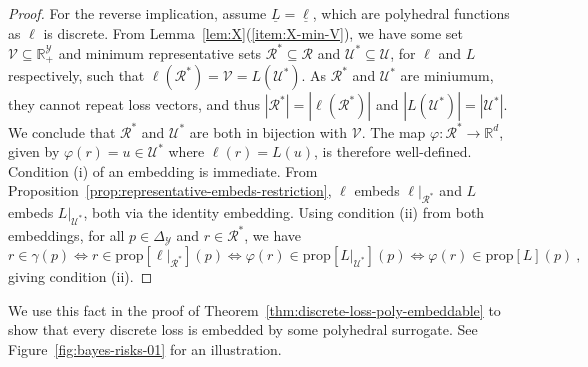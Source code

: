 \documentclass[11pt]{article}
\newcommand{\Comments}{1}
\newcommand{\mynote}[2]{\ifnum\Comments=1\textcolor{#1}{#2}\fi}
\newcommand{\mytodo}[2]{\ifnum\Comments=1%
  \todo[linecolor=#1!80!black,backgroundcolor=#1,bordercolor=#1!80!black]{#2}\fi}
\newcommand{\raft}[1]{\mytodo{green!20!white}{RF: #1}}
\newcommand{\jessie}[1]{\mynote{teal}{[JF: #1]}}
\newcommand{\jessiet}[1]{\mytodo{teal!20!white}{JF: #1}}
\newcommand{\btw}[1]{\mytodo{gray!20!white}{BTW: #1}}%
\newcommand{\reals}{\mathbb{R}}
\newcommand{\prop}[1]{\mathrm{prop}[#1]}
\newcommand{\simplex}{\Delta_\Y}
\newcommand{\R}{\mathcal{R}}
\newcommand{\Sc}{\mathcal{S}}
\newcommand{\U}{\mathcal{U}}
\newcommand{\V}{\mathcal{V}}
\newcommand{\Y}{\mathcal{Y}}
\newcommand{\risk}[1]{\underline{#1}}
\DeclareMathOperator*{\sgn}{sgn}
\begin{document}
\begin{proof}
	For the reverse implication, assume $\risk{L} = \risk{\ell}$, which are polyhedral functions as $\ell$ is discrete.
  From Lemma~\ref{lem:X}(\ref{item:X-min-V}), we have some set $\V\subseteq\reals^\Y_+$ and minimum representative sets $\R^* \subseteq \R$ and $\U^* \subseteq \U$, for $\ell$ and $L$ respectively, such that $\ell(\R^*) = \V = L(\U^*)$.
  As $\R^*$ and $\U^*$ are miniumum, they cannot repeat loss vectors, and thus $|\R^*|=|\ell(\R^*)|$ and $|L(\U^*)|=|\U^*|$.
  We conclude that $\R^*$ and $\U^*$ are both in bijection with $\V$.
  The map $\varphi :\R^* \to \reals^d$, given by $\varphi(r) = u \in \U^*$ where $\ell(r) = L(u)$, is therefore well-defined.
  Condition (i) of an embedding is immediate.
  From Proposition~\ref{prop:representative-embeds-restriction}, $\ell$ embeds $\ell|_{\R^*}$ and $L$ embeds $L|_{\U^*}$, both via the identity embedding.
  Using condition (ii) from both embeddings, for all $p\in\simplex$ and $r\in\R^*$, we have
  \begin{equation*}
    r \in \gamma(p) \iff r \in \prop{\ell|_{\R^*}}(p) \iff \varphi(r) \in \prop{L|_{\U^*}}(p)
    \iff \varphi(r) \in \prop{L}(p)~,
  \end{equation*}
  giving condition (ii).
\end{proof}


We use this fact in the proof of Theorem~\ref{thm:discrete-loss-poly-embeddable} to show that every discrete loss is embedded by some polyhedral surrogate.
See Figure~\ref{fig:bayes-risks-01} for an illustration.


\end{document}
